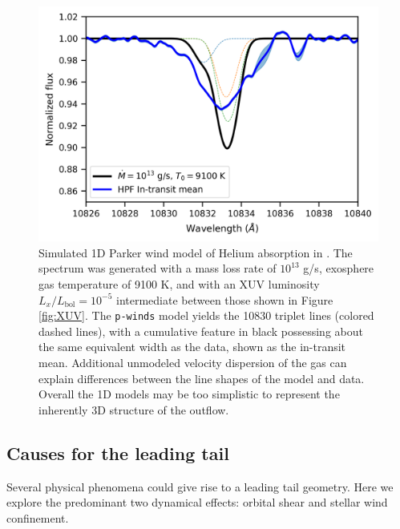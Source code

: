 \documentclass[twocolumn]{aastex631}
\newcommand{\hatpb}{\object{HAT-P-67 b}}
\begin{document}
\begin{figure}
    \includegraphics[width=\linewidth]{figures/pwinds_data_overlay.png}
    \caption{Simulated 1D Parker wind model of Helium absorption in \hatpb.  The spectrum was generated with a mass loss rate of $10^{13}$ g/s, exosphere gas temperature of 9100 K, and with an XUV luminosity $L_x/L_\mathrm{bol}=10^{-5}$ intermediate between those shown in Figure \ref{fig:XUV}.  The \texttt{p-winds} model yields the  10830 triplet lines (colored dashed lines), with a cumulative feature in black possessing about the same equivalent width as the data, shown as the in-transit mean.  Additional unmodeled velocity dispersion of the gas can explain differences between the line shapes of the model and data.  Overall the 1D models may be too simplistic to represent the inherently 3D structure of the outflow.}
    \label{fig:pwinds}
\end{figure}

\subsection{Causes for the leading tail} \label{secLeading}
Several physical phenomena could give rise to a leading tail geometry.  Here we explore the predominant two dynamical effects: orbital shear and stellar wind confinement.
\end{document}
